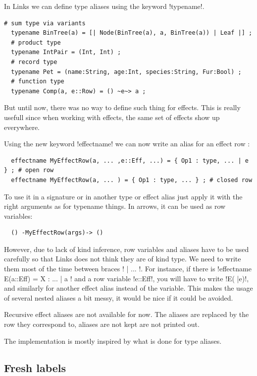 \documentclass[10pt, nonacm=true, language=french, language=english]{acmart}
\begin{document}
In Links we can define type aliases using the keyword !typename!.
\begin{lstlisting}[caption=Type alias examples]
  # sum type via variants
  typename BinTree(a) = [| Node(BinTree(a), a, BinTree(a)) | Leaf |] ;
  # product type
  typename IntPair = (Int, Int) ;
  # record type
  typename Pet = (name:String, age:Int, species:String, Fur:Bool) ;
  # function type
  typename Comp(a, e::Row) = () ~e~> a ;
\end{lstlisting}

But until now, there was no way to define such thing for effects. This is really usefull since when working with effects, the same set of effects show up everywhere.

Using the new keyword !effectname! we can now write an alias for an effect row :
\begin{lstlisting}
  effectname MyEffectRow(a, ... ,e::Eff, ...) = { Op1 : type, ... | e } ; # open row
  effectname MyEffectRow(a, ... ) = { Op1 : type, ... } ; # closed row
\end{lstlisting}

To use it in a signature or in another type or effect alias just apply it with the right arguments as for typename things. In arrows, it can be used as row variables:
\begin{lstlisting}
  () -MyEffectRow(args)-> ()
\end{lstlisting}

However, due to lack of kind inference, row variables and aliases have to be used carefully so that Links does not think they are of kind type. We need to write them most of the time between braces !{ | ... }!. For instance, if there is !effectname E(a::Eff) = {X : ... | a }! and a row variable !e::Eff!, you will have to write !E({ |e})!, and similarly for another effect alias instead of the variable. This makes the usage of several nested aliases a bit messy, it would be nice if it could be avoided.

Recursive effect aliases are not available for now. The aliases are replaced by the row they correspond to, aliases are not kept are not printed out.

The implementation is mostly inspired by what is done for type aliases.

\subsection{Fresh labels}
\label{sec:fresh-labels}
\end{document}
